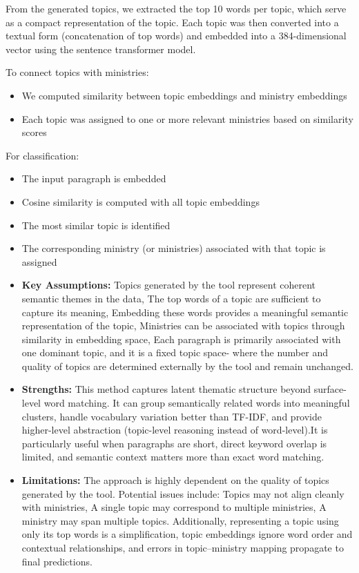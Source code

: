 \documentclass{report}
\begin{document}
From the generated topics, we extracted the top 10 words per topic, which serve as a compact representation of the topic. Each topic was then converted into a textual form (concatenation of top words) and embedded into a 384-dimensional vector using the sentence transformer model.

To connect topics with ministries:
\begin{itemize}[leftmargin=+.5in]
    \item We computed similarity between topic embeddings and ministry embeddings
    \item Each topic was assigned to one or more relevant ministries based on similarity scores
\end{itemize}

For classification:
\begin{itemize}[leftmargin=+.5in]
    \item The input paragraph is embedded
    \item Cosine similarity is computed with all topic embeddings
    \item The most similar topic is identified
    \item The corresponding ministry (or ministries) associated with that topic is assigned
\end{itemize}

\begin{itemize}
    \item \textbf{Key Assumptions:} Topics generated by the tool represent coherent semantic themes in the data, The top words of a topic are sufficient to capture its meaning, Embedding these words provides a meaningful semantic representation of the topic, Ministries can be associated with topics through similarity in embedding space, Each paragraph is primarily associated with one dominant topic, and it is a fixed topic space- where the number and quality of topics are determined externally by the tool and remain unchanged.
    \item \textbf{Strengths:} This method captures latent thematic structure beyond surface-level word matching. It can group semantically related words into meaningful clusters, handle vocabulary variation better than TF-IDF, and provide higher-level abstraction (topic-level reasoning instead of word-level).It is particularly useful when paragraphs are short, direct keyword overlap is limited, and semantic context matters more than exact word matching.
    \item \textbf{Limitations:} The approach is highly dependent on the quality of topics generated by the tool. Potential issues include: Topics may not align cleanly with ministries, A single topic may correspond to multiple ministries, A ministry may span multiple topics. Additionally, representing a topic using only its top words is a simplification, topic embeddings ignore word order and contextual relationships, and errors in topic–ministry mapping propagate to final predictions.
\end{itemize}
\end{document}
